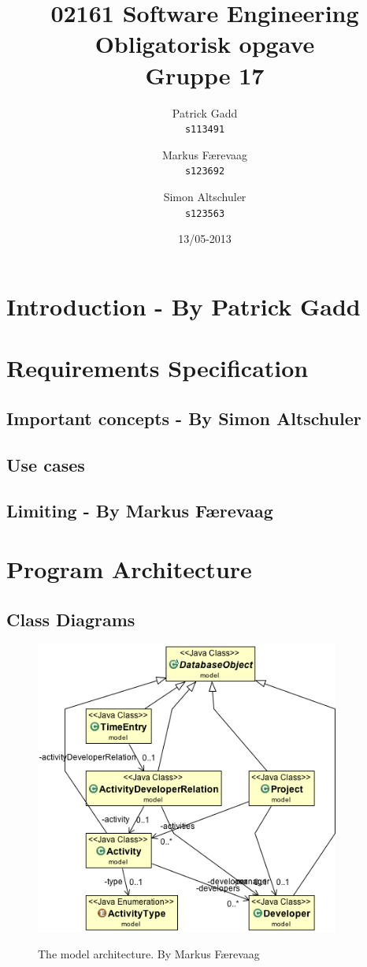 \documentclass[danish]{article}
\author{
  Patrick Gadd\\
  \texttt{s113491}
  \and
  Markus Færevaag\\
  \texttt{s123692}
  \and
  Simon Altschuler\\
  \texttt{s123563}
}
\title{02161 Software Engineering\\
  Obligatorisk opgave\\
Gruppe 17}
\date{13/05-2013}
\begin{document}
\maketitle
\clearpage

\section{Introduction - By Patrick Gadd}


\section{Requirements Specification}
\label{requirements}
\subsection{Important concepts - By Simon Altschuler}


\subsection{Use cases}







\subsection{Limiting - By Markus Færevaag}


\section{Program Architecture}
\label{architecture}
\subsection{Class Diagrams}
\begin{figure}[H]
  \centering
  \includegraphics[width=10cm]{uml/model-simple-uml.png}
  \label{fig:model_uml}
  \caption{The model architecture. By Markus Færevaag}
\end{figure}
\end{document}
